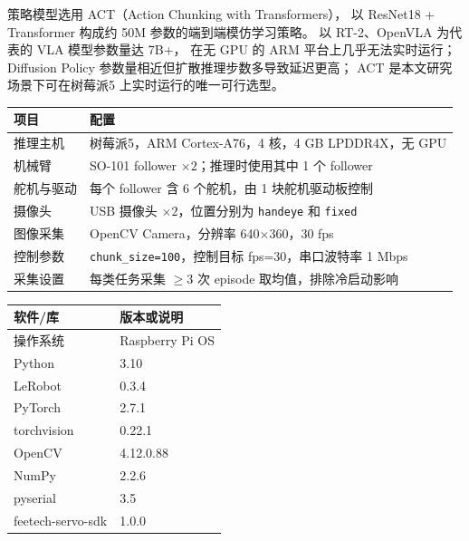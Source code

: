 策略模型选用 ACT\cite{act}（Action Chunking with Transformers），
以 ResNet18 + Transformer 构成约 50M 参数的端到端模仿学习策略。
以 RT-2\cite{rt2}、OpenVLA\cite{openvla} 为代表的 VLA 模型参数量达 7B+，
在无 GPU 的 ARM 平台上几乎无法实时运行；
Diffusion Policy\cite{diffusionpolicy} 参数量相近但扩散推理步数多导致延迟更高；
ACT 是本文研究场景下可在树莓派5 上实时运行的唯一可行选型。

\begin{center}
\begin{tabular}{p{}p{}}
  \toprule
  项目 & 配置 \\
  \midrule
  推理主机 & 树莓派5，ARM Cortex-A76，4 核，4 GB LPDDR4X，无 GPU \\
  机械臂 & SO-101 follower $\times 2$；推理时使用其中 1 个 follower \\
  舵机与驱动 & 每个 follower 含 6 个舵机，由 1 块舵机驱动板控制 \\
  摄像头 & USB 摄像头 $\times 2$，位置分别为 \texttt{handeye} 和 \texttt{fixed} \\
  图像采集 & OpenCV Camera，分辨率 640$\times$360，30 fps \\
  控制参数 & \texttt{chunk\_size=100}，控制目标 fps=30，串口波特率 1 Mbps \\
  采集设置 & 每类任务采集 $\geq 3$ 次 episode 取均值，排除冷启动影响 \\
  \bottomrule
\end{tabular}
\end{center}

\begin{center}
\begin{tabular}{p{}p{}}
  \toprule
  软件/库 & 版本或说明 \\
  \midrule
  操作系统 & Raspberry Pi OS \\
  Python & 3.10 \\
  LeRobot & 0.3.4 \\
  PyTorch & 2.7.1 \\
  torchvision & 0.22.1 \\
  OpenCV & 4.12.0.88 \\
  NumPy & 2.2.6 \\
  pyserial & 3.5 \\
  feetech-servo-sdk & 1.0.0 \\
  \bottomrule
\end{tabular}
\end{center}
